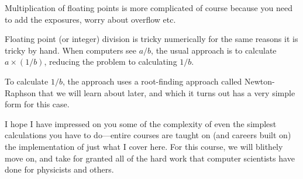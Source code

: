 Multiplication of floating points is more complicated of course
because you need to add the exposures, worry about overflow etc.


Floating point (or integer) division is tricky numerically for the
same reasons it is tricky by hand. When computers see $a/b$, the usual
approach is to calculate $a\times(1/b)$, reducing the problem to
calculating $1/b$. 

To calculate $1/b$, the approach uses a root-finding approach called
Newton-Raphson that we will learn about later, and which it turns out
has a very simple form for this case. 

I hope I have impressed on you some of the complexity of even the
simplest calculations you have to do---entire courses are taught on
(and careers built on) the implementation of just what I cover
here. For this course, we will blithely move on, and take for granted
all of the hard work that computer scientists have done for physicists
and others.

